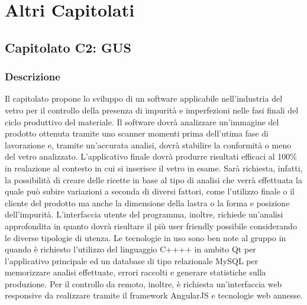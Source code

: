 %

\section{Altri Capitolati}


\subsection{Capitolato C2: GUS}

\subsubsection{Descrizione}
Il capitolato propone lo sviluppo di un software applicabile nell'industria del vetro per il controllo della presenza di impurità e imperfezioni nelle fasi finali del ciclo produttivo del materiale. Il software dovrà analizzare un'immagine del prodotto ottenuta tramite uno scanner momenti prima dell'utima fase di lavorazione e, tramite un'accurata analisi, dovrà stabilire la conformità o meno del vetro analizzato. L'applicativo finale dovrà produrre risultati efficaci al 100\% in realazione al contesto in cui si inserisce il vetro in esame. Sarà richiesta, infatti, la possibilità di creare delle ricette in base al tipo di analisi che verrà effettuata la quale può subire variazioni a seconda di diversi fattori, come l'utilizzo finale o il cliente del prodotto ma anche la dimensione della lastra o la forma e posizione dell'impurità.
L'interfaccia utente del programma, inoltre, richiede un'analisi approfondita in quanto dovrà risultare il più user friendly possibile considerando le diverse tipologie di utenza.
Le tecnologie in uso sono ben note al gruppo in quando è richiesto l'utilizzo del linguaggio C++\gloss{}++ in ambito Qt\gloss{} per l'applicativo principale ed un database\gloss{} di tipo relazionale MySQL per memorizzare analisi effettuate, errori raccolti e generare statistiche sulla produzione. Per il controllo da remoto, inoltre, è richiesta un'interfaccia web responsive da realizzare tramite il framework\gloss{} AngularJS\gloss{} e tecnologie web annesse.

